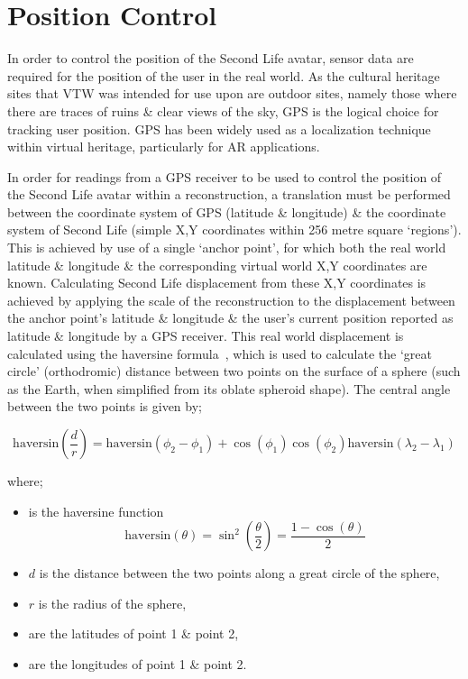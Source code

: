 \section{Position Control}
In order to control the position of the Second Life avatar, sensor data are required for the position of the user in the real world. As the cultural heritage sites that VTW was intended for use upon are outdoor sites, namely those where there are traces of ruins \& clear views of the sky, GPS is the logical choice for tracking user position. GPS has been widely used as a localization technique within virtual heritage, particularly for AR applications.


In order for readings from a GPS receiver to be used to control the position of the Second Life avatar within a reconstruction, a translation must be performed between the coordinate system of GPS (latitude \& longitude) \& the coordinate system of Second Life (simple X,Y coordinates within 256 metre square `regions'). This is achieved by use of a single `anchor point', for which both the real world latitude \& longitude \& the corresponding virtual world X,Y coordinates are known. Calculating Second Life displacement from these X,Y coordinates is achieved by applying the scale of the reconstruction to the displacement between the anchor point's latitude \& longitude \& the user's current position reported as latitude \& longitude by a GPS receiver. This real world displacement is calculated using the haversine formula~\cite{Gellert1989}, which is used to calculate the `great circle' (orthodromic) distance between two points on the surface of a sphere (such as the Earth, when simplified from its oblate spheroid shape). The central angle  between the two points is given by;

\begin{equation}
\label{haversine1}
\text{haversin}\left(\frac{d}{r}\right) = \text{haversin}(\phi_{2}-\phi_{1})+\cos(\phi_{1})\cos(\phi_{2})\text{haversin}(\lambda_{2}-\lambda_{1})
\end{equation}

where;

\begin{itemize}
	\item {} is the haversine function
		\begin{equation}
		\label{harsine2}
			\text{haversin}(\theta) = \sin^{2}\left( \frac{\theta}{2}\right) = \frac{1-\cos(\theta)}{2}
		\end{equation}
	\item $d$ is the distance between the two points along a great circle of the sphere,
	\item $r$ is the radius of the sphere,
	\item {} are the latitudes of point 1 \& point 2,
	\item {} are the longitudes of point 1 \& point 2.
\end{itemize}

